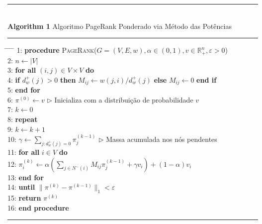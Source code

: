 \documentclass[10pt,a4paper]{article}
\theoremstyle{definition}
\theoremstyle{plain}
\theoremstyle{remark}
\begin{document}
\vspace{0.1cm}
\noindent\rule{\linewidth}{0.8pt}\\[-0.25cm]
\textbf{Algorithm 1} Algoritmo PageRank Ponderado via Método das Potências\\[-0.3cm]
\noindent\rule{\linewidth}{0.4pt}
\begin{tabbing}
\hspace{0.5cm} \= \hspace{0.5cm} \= \hspace{0.5cm} \= \hspace{0.5cm} \= \kill
{\footnotesize 1:} \> \textbf{procedure} \textsc{PageRank}($G = (V, E, w), \alpha \in (0, 1), v \in \mathbb{R}^n_{+}, \varepsilon > 0$)\\
{\footnotesize 2:} \> \> $n \gets |V|$\\
{\footnotesize 3:} \> \> \textbf{for all} $(i, j) \in V \times V$ \textbf{do}\\
{\footnotesize 4:} \> \> \> \textbf{if} $d^{+}_{w}(j) > 0$ \textbf{then} $M_{ij} \gets w(j, i) / d^{+}_{w}(j)$ \textbf{else} $M_{ij} \gets 0$ \textbf{end if}\\
{\footnotesize 5:} \> \> \textbf{end for}\\
{\footnotesize 6:} \> \> $\pi^{(0)} \gets v$ \hspace{3.2cm} $\triangleright$ Inicializa com a distribuição de probabilidade $v$\\
{\footnotesize 7:} \> \> $k \gets 0$\\
{\footnotesize 8:} \> \> \textbf{repeat}\\
{\footnotesize 9:} \> \> \> $k \gets k + 1$\\
{\footnotesize 10:} \> \> \> $\gamma \gets \sum_{j : d^{+}_{w}(j) = 0} \pi^{(k-1)}_j$ \hspace{0.6cm} $\triangleright$ Massa acumulada nos nós pendentes\\
{\footnotesize 11:} \> \> \> \textbf{for all} $i \in V$ \textbf{do}\\
{\footnotesize 12:} \> \> \> \> $\pi^{(k)}_i \gets \alpha \left( \sum_{j \in N^{-}(i)} M_{ij} \pi^{(k-1)}_j + \gamma v_i \right) + (1 - \alpha) v_i$\\
{\footnotesize 13:} \> \> \> \textbf{end for}\\
{\footnotesize 14:} \> \> \textbf{until} $\|\pi^{(k)} - \pi^{(k-1)}\|_1 < \varepsilon$\\
{\footnotesize 15:} \> \> \textbf{return} $\pi^{(k)}$\\
{\footnotesize 16:} \> \textbf{end procedure}
\end{tabbing}
\vspace{-0.35cm}
\noindent\rule{\linewidth}{0.4pt}
\vspace{0.1cm}
\end{document}
